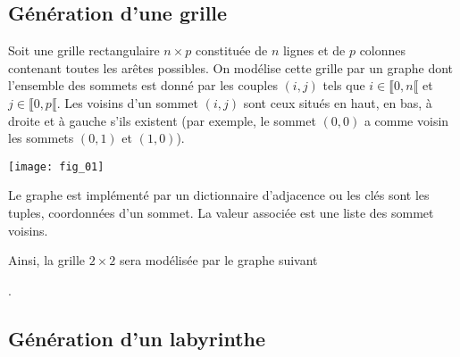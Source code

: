 %
\setcounter{numques}{0}


\subsection*{Génération d'une grille}

Soit une grille rectangulaire $n\times p$ constituée de $n$ lignes et de $p$ colonnes contenant toutes les arêtes possibles. On modélise cette grille par un graphe dont l'ensemble des sommets est donné par les couples $(i,j)$ tels que $i\in\llbracket 0,n \llbracket $ et $j\in\llbracket 0,p \llbracket $. Les voisins d'un sommet $(i,j)$ sont ceux situés en haut, en bas, à droite et à gauche s'ils existent (par exemple, le sommet $(0,0)$ a comme voisin les sommets $(0,1)$ et $(1,0)$).

\begin{center}
\texttt{[image: fig\_01]}
\end{center}

Le graphe est implémenté par un dictionnaire d'adjacence ou les clés sont les tuples, coordonnées d'un sommet. La valeur associée est une liste des sommet voisins. 


Ainsi, la grille $ 2 \times 2$ sera modélisée par le graphe suivant

.



\subsection*{Génération d'un labyrinthe}